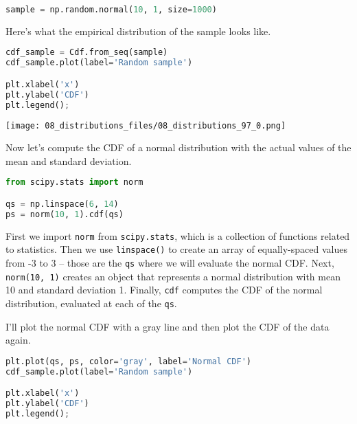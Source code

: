 \begin{lstlisting}[language=Python,style=source]
sample = np.random.normal(10, 1, size=1000)
\end{lstlisting}

Here's what the empirical distribution of the sample looks like.

\begin{lstlisting}[language=Python,style=source]
cdf_sample = Cdf.from_seq(sample)
cdf_sample.plot(label='Random sample')

plt.xlabel('x')
plt.ylabel('CDF')
plt.legend();
\end{lstlisting}

\begin{center}
\texttt{[image: 08\_distributions\_files/08\_distributions\_97\_0.png]}
\end{center}

Now let's compute the CDF of a normal distribution with the actual
values of the mean and standard deviation.

\begin{lstlisting}[language=Python,style=source]
from scipy.stats import norm

qs = np.linspace(6, 14)
ps = norm(10, 1).cdf(qs)
\end{lstlisting}

First we import \passthrough{\lstinline!norm!} from
\passthrough{\lstinline!scipy.stats!}, which is a collection of
functions related to statistics. Then we use
\passthrough{\lstinline!linspace()!} to create an array of
equally-spaced values from -3 to 3 -- those are the
\passthrough{\lstinline!qs!} where we will evaluate the normal CDF.
Next, \passthrough{\lstinline!norm(10, 1)!} creates an object that
represents a normal distribution with mean 10 and standard deviation 1.
Finally, \passthrough{\lstinline!cdf!} computes the CDF of the normal
distribution, evaluated at each of the \passthrough{\lstinline!qs!}.


I'll plot the normal CDF with a gray line and then plot the CDF of the
data again.

\begin{lstlisting}[language=Python,style=source]
plt.plot(qs, ps, color='gray', label='Normal CDF')
cdf_sample.plot(label='Random sample')

plt.xlabel('x')
plt.ylabel('CDF')
plt.legend();
\end{lstlisting}

